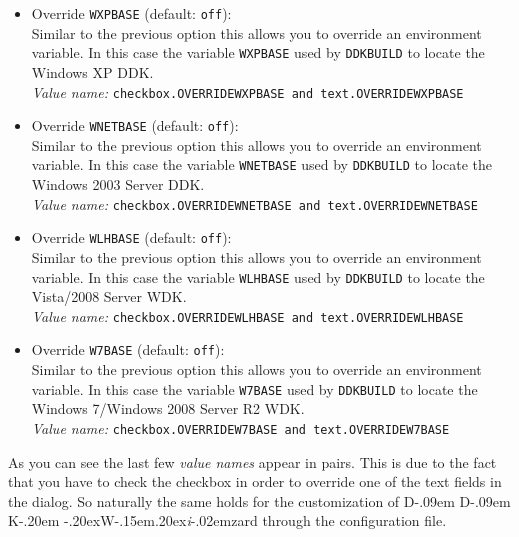 \documentclass[a4paper,titlepage]{report}
\newcommand{\default}[1]{\textcolor[gray]{0.40}{(default: \texttt{#1})}}
\newcommand{\option}[1]{\textcolor[rgb]{0.00,0.20,0.20}{\textsf{#1}}}
\newcommand{\optiondeco}[1]{#1\vspace{0.1cm}}
\newcommand{\inioption}[1]{\\\textcolor[rgb]{0.00,0.00,0.40}{\textsl{Value name:} \texttt{#1}}}
\def\ddkwiz{D\kern-.09em D\kern-.09em K\kern-.20em \raise-.20ex\hbox{W}\kern-.15em\raise.20ex\hbox{\it{i}}\kern-.02em{zard}}
\begin{document}
\begin{itemize}
  If you enable this option, you can override the value of the environment variable
  \texttt{DDKBUILD\_PATH} for the created projects. This allows you for example
  to customize \texttt{DDKBUILD} and point the projects to your own version of
  \texttt{DDKBUILD}\footnote{\ddkwiz{} still makes the assumption that the
  options are compatible with OSRs \texttt{DDKBUILD} versions.}.\\
  Note that you have to give the full path including the filename of your
  \texttt{DDKBUILD} script.
  \inioption{checkbox.OVERRIDEDDKBUILD \textrm{and} text.OVERRIDEDDKBUILD}
  \item \optiondeco{\option{Override \texttt{WXPBASE}} \default{off}:}\\
  Similar to the previous option this allows you to override an environment
  variable.
  In this case the variable \texttt{WXPBASE} used by \texttt{DDKBUILD} to
  locate the Windows XP DDK.
  \inioption{checkbox.OVERRIDEWXPBASE \textrm{and} text.OVERRIDEWXPBASE}
  \item \optiondeco{\option{Override \texttt{WNETBASE}} \default{off}:}\\
  Similar to the previous option this allows you to override an environment
  variable.
  In this case the variable \texttt{WNETBASE} used by \texttt{DDKBUILD} to
  locate the Windows 2003 Server DDK.
  \inioption{checkbox.OVERRIDEWNETBASE \textrm{and} text.OVERRIDEWNETBASE}
  \item \optiondeco{\option{Override \texttt{WLHBASE}} \default{off}:}\\
  Similar to the previous option this allows you to override an environment
  variable.
  In this case the variable \texttt{WLHBASE} used by \texttt{DDKBUILD} to
  locate the Vista/2008 Server WDK.
  \inioption{checkbox.OVERRIDEWLHBASE \textrm{and} text.OVERRIDEWLHBASE}
  \item \optiondeco{\option{Override \texttt{W7BASE}} \default{off}:}\\
  Similar to the previous option this allows you to override an environment
  variable.
  In this case the variable \texttt{W7BASE} used by \texttt{DDKBUILD} to
  locate the Windows 7/Windows 2008 Server R2 WDK.
  \inioption{checkbox.OVERRIDEW7BASE \textrm{and} text.OVERRIDEW7BASE}
\end{itemize}

As you can see the last few \emph{value names} appear in pairs. This is due to the
fact that you have to check the checkbox in order to override one of the
text fields in the dialog. So naturally the same holds for the customization
of \ddkwiz{} through the configuration file.\\
\end{document}
